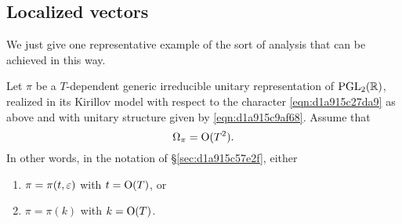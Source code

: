 \documentclass[reqno]{amsart} 
\numberwithin{equation}{section}
\numberwithin{theorem}{section}
\begin{document}
\subsection{Localized vectors}\label{sec:d1a9162d5b8b}
We just give one representative example of the sort of analysis that can be achieved in this way.

\begin{exercise}\label{exercise:d1a9162d527e}
  Let $\pi$ be a $T$-dependent generic irreducible unitary representation of $\operatorname{PGL}_2(\mathbb{R})$, realized in its Kirillov model with respect to the character \eqref{eqn:d1a915c27da9} as above and with unitary structure given by \eqref{eqn:d1a915c9af68}.  Assume that
  \begin{equation*}
    \Omega_\pi = \operatorname{O}(T^2).
  \end{equation*}
  In other words, in the notation of \S\ref{sec:d1a915c57e2f}, either
  \begin{enumerate}
  \item $\pi = \pi(t,\varepsilon)$ with $t = \operatorname{O}(T)$, or
  \item $\pi = \pi(k)$ with $k = \operatorname{O}(T)$.
  \end{enumerate}


\end{exercise}
\end{document}
